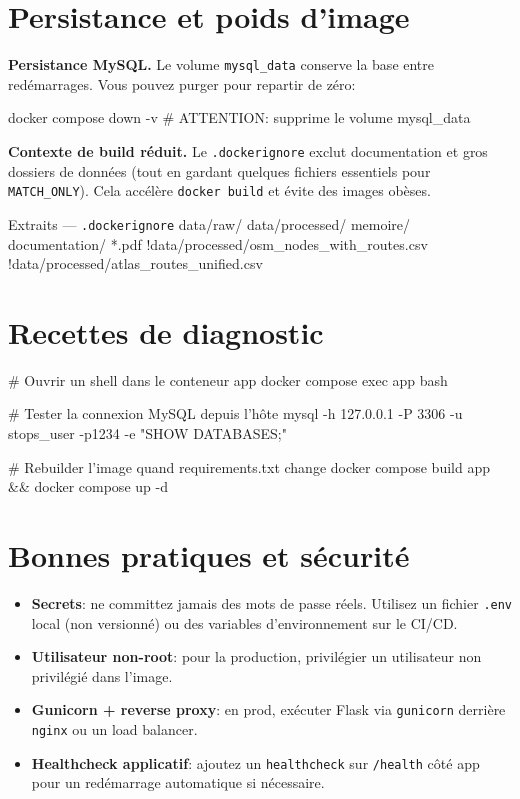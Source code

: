 \section{Persistance et poids d'image}

\textbf{Persistance MySQL.} Le volume \texttt{mysql\_data} conserve la base entre redémarrages. Vous pouvez purger pour repartir de zéro:

\begin{cmdbox}
docker compose down -v  # ATTENTION: supprime le volume mysql_data
\end{cmdbox}

\textbf{Contexte de build réduit.} Le \texttt{.dockerignore} exclut documentation et gros dossiers de données (tout en gardant quelques fichiers essentiels pour \texttt{MATCH\_ONLY}). Cela accélère \texttt{docker build} et évite des images obèses.

\begin{codebox}[language=bash]{Extraits — \texttt{.dockerignore}}
data/raw/
data/processed/
memoire/
documentation/
*.pdf
!data/processed/osm_nodes_with_routes.csv
!data/processed/atlas_routes_unified.csv
\end{codebox}

\section{Recettes de diagnostic}

\begin{cmdbox}
# Ouvrir un shell dans le conteneur app
docker compose exec app bash

# Tester la connexion MySQL depuis l'hôte
mysql -h 127.0.0.1 -P 3306 -u stops_user -p1234 -e "SHOW DATABASES;"

# Rebuilder l'image quand requirements.txt change
docker compose build app && docker compose up -d
\end{cmdbox}

\section{Bonnes pratiques et sécurité}

\begin{itemize}
  \item \textbf{Secrets}: ne committez jamais des mots de passe réels. Utilisez un fichier \texttt{.env} local (non versionné) ou des variables d'environnement sur le CI/CD.
  \item \textbf{Utilisateur non-root}: pour la production, privilégier un utilisateur non privilégié dans l'image.
  \item \textbf{Gunicorn + reverse proxy}: en prod, exécuter Flask via \texttt{gunicorn} derrière \texttt{nginx} ou un load balancer.
  \item \textbf{Healthcheck applicatif}: ajoutez un \texttt{healthcheck} sur \texttt{/health} côté app pour un redémarrage automatique si nécessaire.
\end{itemize}

